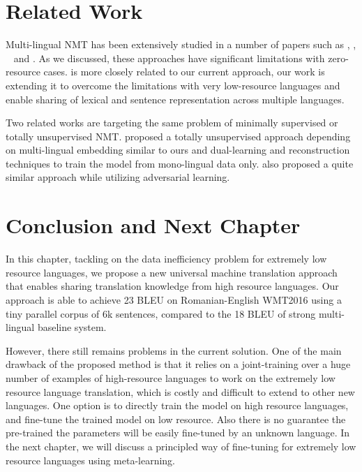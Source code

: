 \section{Related Work} 
Multi-lingual NMT has been extensively studied in a number of papers such as  , , ~ and . As we discussed, these approaches have significant limitations with zero-resource cases.  is more closely related to our current approach, our work is extending  it  to overcome the  limitations with very low-resource languages and enable sharing of  lexical and sentence representation across multiple languages. 

Two related works are targeting the same problem of  minimally supervised  or totally unsupervised NMT.  proposed a totally unsupervised approach depending on multi-lingual embedding similar to ours and dual-learning and reconstruction techniques to train the model from mono-lingual data only.  also proposed a quite similar approach while utilizing adversarial learning.   

\section{Conclusion and Next Chapter}
 In this chapter, tackling on the data inefficiency problem for extremely low resource languages, we propose a new  universal machine translation approach that enables sharing translation knowledge from high resource languages.  Our approach is able to achieve 23 BLEU on Romanian-English WMT2016 using a tiny parallel corpus of 6k sentences, compared to the 18 BLEU of strong multi-lingual baseline system. 
 
 However, there still remains problems in the current solution. One of the main drawback of the proposed method is that it relies on a joint-training over a huge number of examples of high-resource languages to work on the extremely low resource language translation, which is costly and difficult to extend to other new languages. One option is to directly train the model on high resource languages, and fine-tune the trained model on low resource. Also there is no guarantee the pre-trained the parameters will be easily fine-tuned by an unknown language. 
 In the next chapter, we will discuss a principled way of fine-tuning for extremely low resource languages using meta-learning.
 
 
 